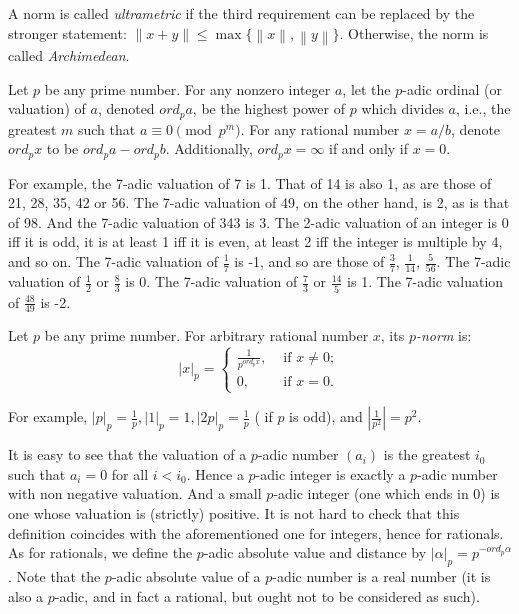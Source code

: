 \documentclass{llncs}
\newcommand{\norm}[1]{\left\| #1 \right\|}
\begin{document}
A norm  is called {\em ultrametric}  if the third requirement can be replaced by the stronger statement:
$\norm{x+y} \leq \max \{\norm{x}, \norm{y} \}$.
Otherwise, the norm is called {\em Archimedean}.

\begin{definition}
Let $p$ be any prime number. For any nonzero integer $a$, let the $p$-adic ordinal (or valuation) of $a$, denoted $ord_p a$, be the highest power of $p$ which divides $a$, i.e., the greatest $m$ such that $a \equiv 0 \pmod{p^{m}}$. For any rational number $x = a/b$, denote $ord_p x$ to be $ord_p a - ord_p b$. Additionally, $ord_p x = \infty $ if and only if $x = 0$.
\end{definition}

For example, the 7-adic valuation of 7 is 1. That of 14 is also 1, as are those of 21, 28, 35, 42 or 56. The 7-adic valuation of 49, on the other hand, is 2, as is that of 98. And the 7-adic valuation of 343 is 3. The 2-adic valuation of an integer is 0 iff it is odd, it is at least 1 iff it is even, at least 2 iff the integer is multiple by 4, and so on. The 7-adic valuation of $\frac{1}{7}$ is -1, and so are those of $\frac{3}{7}$, $\frac{1}{14}$, $\frac{5}{56}$. The 7-adic valuation of $\frac{1}{2}$ or $\frac{8}{3}$ is 0. The 7-adic valuation of $\frac{7}{3}$ or $\frac{14}{5}$ is 1. The 7-adic valuation of $\frac{48}{49}$ is -2.

\begin{definition}
Let $p$ be any prime number. For arbitrary rational number $x$, its {\em $p$-norm} is:
\[|x|_p = \begin{cases}
  \frac{1}{p^{ord_p x}}, &\text{ if } x \neq 0;\\
  0, &\text{ if } x = 0.
\end{cases}\]
\end{definition}

For example, $|p|_p = \frac{1}{p} , |1|_p = 1, |2p|_p = \frac{1}{p}$ ( if $p$ is odd), and $|\frac{1}{p^2}| = p^2$.

It is easy to see that the valuation of a $p$-adic number $(a_i)$ is the greatest $i_0$ such that $a_i = 0$ for all $i < i_0$. Hence a $p$-adic integer is exactly a $p$-adic number with non negative valuation. And a small $p$-adic integer (one which ends in 0) is one whose valuation is (strictly) positive. It is not hard to check that this definition coincides with the aforementioned one for integers, hence for rationals. As for rationals, we define the $p$-adic absolute value and distance by $|\alpha |_p = p^{- ord_p \alpha }$. Note that the $p$-adic absolute value of a $p$-adic number is a real number (it is also a $p$-adic, and in fact a rational, but ought not to be considered as such).
\end{document}
